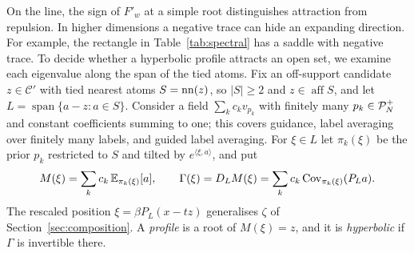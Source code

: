 \documentclass{article} %
\theoremstyle{plain}
\theoremstyle{definition}
\theoremstyle{remark}
\begin{document}
On the line, the sign of $F'_w$ at a simple root distinguishes attraction from repulsion.
In higher dimensions a negative trace can hide an expanding direction. For example, the
rectangle in Table~\ref{tab:spectral} has a saddle with negative trace. To decide whether
a hyperbolic profile attracts an open set, we examine each eigenvalue along the span of the
tied atoms. Fix an off-support candidate $z\in\mathcal C'$ with tied
nearest atoms $S=\operatorname{nn}(z)$, so $|S|\ge2$ and $z\in\operatorname{aff}S$, and let
$L=\operatorname{span}\{a-z:a\in S\}$. Consider a field $\sum_kc_kv_{p_k}$ with finitely many
$p_k\in\mathcal{P}_N^{+}$ and constant coefficients summing to one; this covers guidance, label averaging
over finitely many labels, and guided label averaging. For $\xi\in L$ let $\pi_k(\xi)$ be the
prior $p_k$ restricted to $S$ and tilted by $e^{\langle\xi,a\rangle}$, and put
\begin{equation}
M(\xi)=\sum_kc_k\,\mathbb{E}_{\pi_k(\xi)}[a],\qquad
\Gamma(\xi)=D_LM(\xi)=\sum_kc_k\operatorname{Cov}_{\pi_k(\xi)}(P_La).
\label{eq:profile-mean}
\end{equation}
The rescaled position $\xi=\beta P_L(x-tz)$ generalises $\zeta$ of Section~\ref{sec:composition}. A
\emph{profile} is a root of $M(\xi)=z$, and it is \emph{hyperbolic} if $\Gamma$ is invertible
there.
\end{document}

